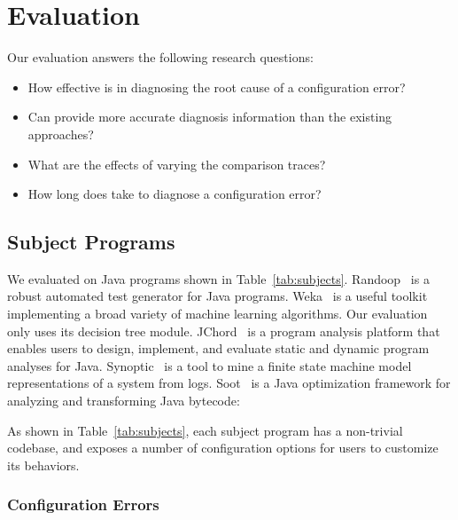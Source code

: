 \section{Evaluation}
\label{sec:evaluation}


Our evaluation answers the following research questions:

\begin{itemize}
\item How effective is \ourtool in diagnosing the root cause of
a configuration error?
\item Can \ourtool provide more accurate diagnosis information than
the existing approaches? 
\item What are the effects of varying the comparison traces?
\item How long does \ourtool take to diagnose a configuration error?
\end{itemize}


\subsection{Subject Programs}

We evaluated \ourtool on \subjectnum Java programs shown
in Table~\ref{tab:subjects}.
Randoop~\cite{randoop} is a robust automated test generator
for Java programs. Weka~\cite{weka} is a useful toolkit implementing
a broad variety of machine learning algorithms. Our evaluation
only uses its decision tree module. JChord~\cite{jchord}
is a program analysis platform that enables users to design, implement,
and evaluate static and dynamic program analyses for Java.
Synoptic~\cite{synoptic} is a tool to mine a finite state machine
model representations of a system from logs.
Soot~\cite{soot} is a Java optimization framework for analyzing and transforming Java bytecode:

As shown in Table~\ref{tab:subjects}, each subject program has a non-trivial
codebase, and exposes a number of configuration options for users
to customize its behaviors.

\subsubsection{Configuration Errors}



